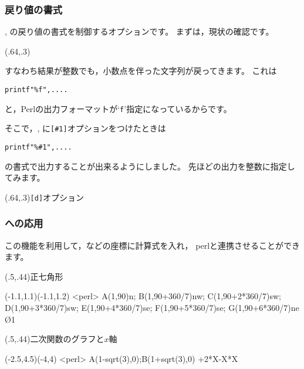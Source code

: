 \subsubsection{戻り値の書式}
, の戻り値の書式を制御するオプションです。
まずは，現状の確認です。

\begin{showEx}(.64,.3){}
\y
\y
\end{showEx}

すなわち結果が整数でも，小数点を伴った文字列が戻ってきます。
これは
\begin{jquote}
\begin{verbatim}
printf"%f",....
\end{verbatim}
\end{jquote}
と，\textsf{Perl}の出力フォーマットが`\texttt{f}'指定になっているからです。

そこで，, に\verb+[#1]+オプションをつけたときは
\begin{jquote}
\begin{verbatim}
printf"%#1",....
\end{verbatim}
\end{jquote}
の書式で出力することが出来るようにしました。
先ほどの出力を整数に指定してみます。

\begin{showEx}(.64,.3){\texttt{[d]}オプション}
\y
\y
\end{showEx}

\subsubsection{への応用}
この機能を利用して，などの座標に計算式を入れ，
\textsf{perl}と連携させることができます。

\begin{showEx}(.5,.44){正七角形}
\begin{zahyou*}[ul=25mm]%
      (-1.1,1.1)(-1.1,1.2)
  \rtenretu<perl>{%
    A(1,90)n;
    B(1,90+360/7)nw;
    C(1,90+2*360/7)sw;
    D(1,90+3*360/7)sw;
    E(1,90+4*360/7)se;
    F(1,90+5*360/7)se;
    G(1,90+6*360/7)ne}
  \Drawline{\A\B\C\D\E\F\G\A}
  \En\O{1}%
\end{zahyou*}
\end{showEx}

\begin{showEx}(.5,.44){二次関数のグラフと$x$軸}
\begin{zahyou}[ul=8mm]%
      (-2.5,4.5)(-4,4)
  \def\Fx{2+2*X-X*X}
  \Put\C[syaei=xy]{}
  \tenretu*<perl>{%
    A(1-sqrt(3),0);B(1+sqrt(3),0)}
  \Put{}
  \Put{}
  \YGurafu*\Fx
  \kuromaru{\A;\B;\C}
\end{zahyou}
\end{showEx}



